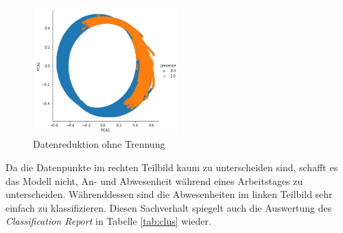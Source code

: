 \begin{figure}[h]
    \centering
    \includegraphics[width=0.5\textwidth]{pic/pca1.png}
    \caption{Datenreduktion ohne Trennung}
    \label{fig:pca1}
\end{figure}

Da die Datenpunkte im rechten Teilbild kaum zu unterscheiden sind, schafft es das Modell nicht, An- und Abwesenheit
während eines Arbeitstages zu unterscheiden. Währenddessen sind die Abwesenheiten im linken Teilbild sehr einfach
zu klassifizieren.
Diesen Sachverhalt spiegelt auch die Auswertung des \textit{Classification Report} in Tabelle \ref{tab:clus} wieder.\\
